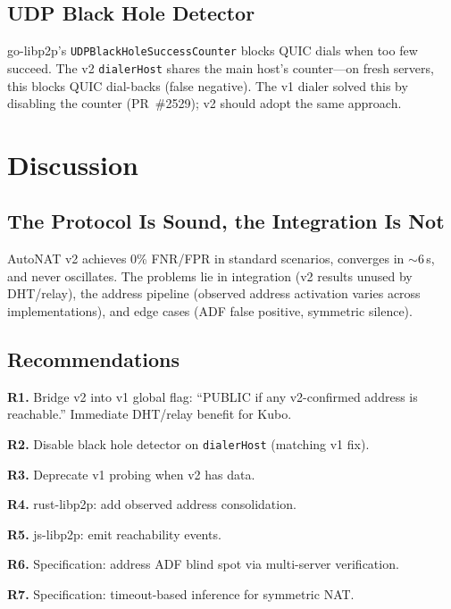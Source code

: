 \documentclass[conference]{IEEEtran}
\begin{document}
\subsection{UDP Black Hole Detector}

go-libp2p's \texttt{UDPBlackHoleSuccessCounter} blocks QUIC dials when too few succeed. The v2 \texttt{dialerHost} shares the main host's counter---on fresh servers, this blocks QUIC dial-backs (false negative). The v1 dialer solved this by disabling the counter (PR~\#2529); v2 should adopt the same approach.

\section{Discussion}

\subsection{The Protocol Is Sound, the Integration Is Not}

AutoNAT v2 achieves 0\% FNR/FPR in standard scenarios, converges in ${\sim}6$\,s, and never oscillates. The problems lie in integration (v2 results unused by DHT/relay), the address pipeline (observed address activation varies across implementations), and edge cases (ADF false positive, symmetric silence).

\subsection{Recommendations}

\textbf{R1.} Bridge v2 into v1 global flag: ``PUBLIC if any v2-confirmed address is reachable.'' Immediate DHT/relay benefit for Kubo.

\textbf{R2.} Disable black hole detector on \texttt{dialerHost} (matching v1 fix).

\textbf{R3.} Deprecate v1 probing when v2 has data.

\textbf{R4.} rust-libp2p: add observed address consolidation.

\textbf{R5.} js-libp2p: emit reachability events.

\textbf{R6.} Specification: address ADF blind spot via multi-server verification.

\textbf{R7.} Specification: timeout-based inference for symmetric NAT.
\end{document}
